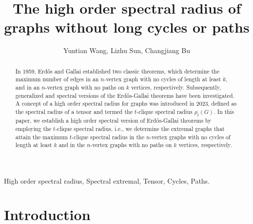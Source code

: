 \documentclass[preprint,12pt]{elsarticle}
\begin{document}
\begin{frontmatter}

\title{The high order spectral radius of graphs without long cycles or paths }

\author{Yuntian Wang, Lizhu Sun, Changjiang Bu}

\address{College of Mathematical Sciences, Harbin Engineering University, Harbin 150001, PR China}

\begin{abstract}
    In 1959, Erd\H{o}s and Gallai established two classic theorems, which determine the maximum number of edges in an $n$-vertex graph with no cycles of length at least $k$, and in an $n$-vertex graph with no paths on $k$ vertices, respectively.
    Subsequently, generalized and spectral versions of the Erd\H{o}s-Gallai theorems have been investigated.
    A concept of a high order spectral radius for graphs was introduced in 2023, defined as the spectral radius of a tensor and termed the $t$-clique spectral radius $\rho_t(G)$.
    In this paper, we establish a high order spectral version of Erd\H{o}s-Gallai theorems by employing the $t$-clique spectral radius, i.e., we determine the extremal graphs that attain the maximum $t$-clique spectral radius in the $n$-vertex graphs with no cycles of length at least $k$ and in the $n$-vertex graphs with no paths on $k$ vertices, respectively.
\end{abstract}


\begin{keyword}
High order spectral radius, Spectral extremal, Tensor, Cycles, Paths.

\end{keyword}

\end{frontmatter}

\section{Introduction}
\end{document}
